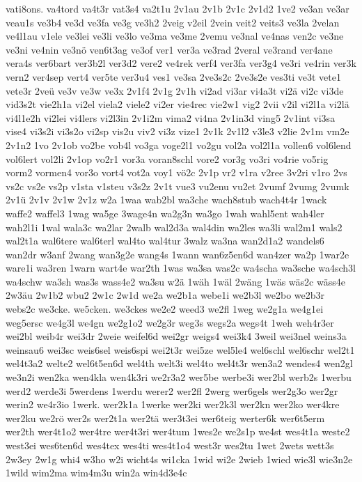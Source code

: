 {vati8ons.
va4tord
va4t3r
vat3s4
va2t1u
2v1au
2v1b
2v1c
2v1d2
1ve2
ve3an
ve3ar
veau1s
ve3b4
ve3d
ve3fa
ve3g
ve3h2
2veig
v2eil
2vein
veit2
veits3
ve3la
2velan
ve4l1au
v1ele
ve3lei
ve3li
ve3lo
ve3ma
ve3me
2vemu
ve3nal
ve4nas
ven2c
ve3ne
ve3ni
ve4nin
ve3nö
ven6t3ag
ve3of
ver1
ver3a
ve3rad
2veral
ve3rand
ver4ane
vera4s
ver6bart
ver3b2l
ver3d2
vere2
ve4rek
verf4
ver3fa
ver3g4
ve3ri
ve4rin
ver3k
vern2
ver4sep
vert4
ver5te
ver3u4
ves1
ve3sa
2ve3s2c
2ve3s2e
ves3ti
ve3t
vete1
vete3r
2veü
ve3v
ve3w
ve3x
2v1f4
2v1g
2v1h
vi2ad
vi3ar
vi4a3t
vi2ä
vi2c
vi3de
vid3s2t
vie2h1a
vi2el
viela2
viele2
vi2er
vie4rec
vie2w1
vig2
2vii
v2il
vi2l1a
vi2lä
vi4l1e2h
vi2lei
vi4lers
vi2l3in
2v1i2m
vima2
vi4na
2v1in3d
ving5
2v1int
vi3sa
vise4
vi3s2i
vi3s2o
vi2sp
vis2u
viv2
vi3z
vize1
2v1k
2v1l2
v3le3
v2lie
2v1m
vm2e
2v1n2
1vo
2v1ob
vo2be
vob4l
vo3ga
voge2l1
vo2gu
vol2a
vol2l1a
vollen6
vol6lend
vol6lert
vol2li
2v1op
vo2r1
vor3a
voran8schl
vore2
vor3g
vo3ri
vo4rie
vo5rig
vorm2
vormen4
vor3o
vort4
vot2a
voy1
vö2c
2v1p
vr2
v1ra
v2ree
3v2ri
v1ro
2vs
vs2c
vs2e
vs2p
v1sta
v1steu
v3s2z
2v1t
vue3
vu2enu
vu2et
2vumf
2vumg
2vumk
2v1ü
2v1v
2v1w
2v1z
w2a
1waa
wab2bl
wa3che
wach8stub
wach4t4r
1wack
waffe2
waffel3
1wag
wa5ge
3wage4n
wa2g3n
wa3go
1wah
wahl5ent
wah4ler
wah2l1i
1wal
wala3c
wa2lar
2walb
wal2d3a
wal4din
wa2les
wa3li
wal2m1
wals2
wal2t1a
wal6tere
wal6terl
wal4to
wal4tur
3walz
wa3na
wan2d1a2
wandels6
wan2dr
w3anf
2wang
wan3g2e
wang4s
1wann
wan6z5en6d
wan4zer
wa2p
1war2e
ware1i
wa3ren
1warn
wart4e
war2th
1was
wa3sa
was2c
wa4scha
wa3sche
wa4sch3l
wa4schw
wa3sh
was3s
wass4e2
wa3su
w2ä
1wäh
1wäl
2wäng
1wäs
wäs2c
wäss4e
2w3äu
2w1b2
wbu2
2w1c
2w1d
we2a
we2b1a
webe1i
we2b3l
we2bo
we2b3r
webs2c
we3cke.
we5cken.
we3ckes
we2e2
weed3
we2fl
1weg
we2g1a
we4g1ei
weg5ersc
we4g3l
we4gn
we2g1o2
we2g3r
weg3s
wegs2a
wegs4t
1weh
weh4r3er
wei2bl
weib4r
wei3dr
2weie
weifel6d
wei2gr
weigs4
wei3k4
3weil
wei3nel
weins3a
weinsau6
wei3sc
weis6sel
weis6spi
wei2t3r
wei5ze
wel5le4
wel6schl
wel6schr
wel2t1
wel4t3a2
welte2
wel6t5en6d
wel4th
welt3i
wel4to
wel4t3r
wen3a2
wendes4
wen2gl
we3n2i
wen2ka
wen4kla
wen4k3ri
we2r3a2
wer5be
werbe3i
wer2bl
werb2s
1werbu
werd2
werde3i
5werdens
1werdu
werer2
wer2fl
2werg
wer6gels
wer2g3o
wer2gr
werin2
we4r3io
1werk.
wer2k1a
1werke
wer2ki
wer2k3l
wer2kn
wer2ko
wer4kre
wer2ku
we2rö
wer2s
wer2t1a
wer2tä
wer3t3ei
wer6teig
werter6k
wer6t5erm
wer2th
wer4t1o2
wer4tre
wer4t3ri
wer4tum
1wes2e
we2s1p
we4st
wes4t1a
weste2
west3ei
wes6ten6d
wes4tex
wes4ti
wes4t1o4
west3r
wes2tu
1wet
2wets
wett3s
2w3ey
2w1g
whi4
w3ho
w2i
wicht4s
wi1cka
1wid
wi2e
2wieb
1wied
wie3l
wie3n2e
1wild
wim2ma
wim4m3u
win2a
win4d3e4c
}
